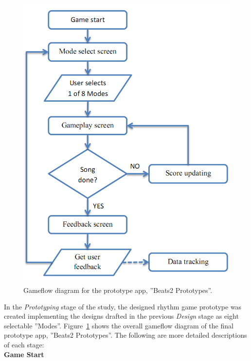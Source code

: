 \documentclass{sig-alternate}
\begin{document}
\begin{figure}[htb!]
	\begin{center}
		\includegraphics[width=1\linewidth]{figure_prototype_gameflow}
	\end{center}
	\vspace{-12pt}
	\caption{Gameflow diagram for the prototype app, ''Beats2 Prototypes''.}
	\label{fig:prototype_gameflow}
\end{figure}

In the \textit{Prototyping} stage of the study, the designed rhythm game prototype was created implementing the designs drafted in the previous \textit{Design} stage as eight selectable ''Modes''. Figure~\ref{fig:prototype_gameflow} shows the overall gameflow diagram of the final prototype app, ''Beats2 Prototypes''. The following are more detailed descriptions of each stage: \\

\newpage
\noindent \textbf{Game Start}
\end{document}
